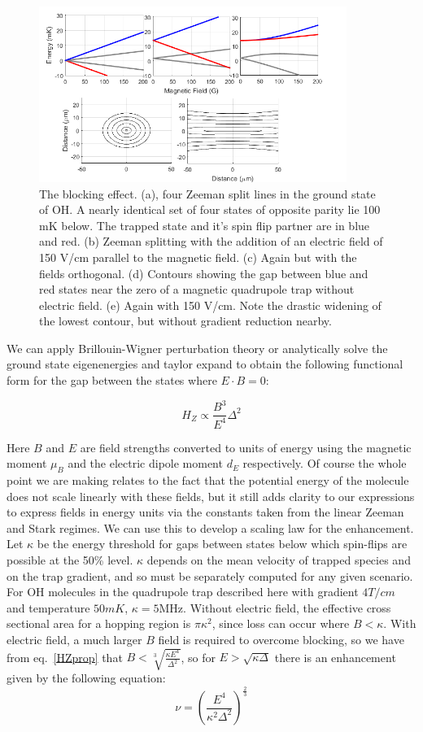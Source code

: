 \documentclass[%
 reprint,
 amsmath,amssymb,
 aps,
prl,
]{revtex4-1}
\begin{document}
\begin{figure}[b]
\includegraphics[width=100mm]{blocking.png}%
\caption{
The blocking effect. (a), four Zeeman split lines in the ground state of OH. A nearly identical set of four states of opposite parity lie 100 mK below. The trapped state and it's spin flip partner are in blue and red. (b) Zeeman splitting with the addition of an electric field of 150 V/cm parallel to the magnetic field. (c) Again but with the fields orthogonal. (d) Contours showing the gap between blue and red states near the zero of a magnetic quadrupole trap without electric field. (e) Again with 150 V/cm. Note the drastic widening of the lowest contour, but without gradient reduction nearby.
\label{fig:blocking}}
\end{figure}

We can apply Brillouin-Wigner perturbation theory or analytically solve the ground state eigenenergies and taylor expand to obtain the following functional form for the gap between the states where $E\cdot B=0$:

\begin{equation}
\label{eq:HZprop}
H_Z\propto \frac{B^3}{E^4}\Delta^2
\end{equation}

\noindent Here $B$ and $E$ are field strengths converted to units of energy using the magnetic moment $\mu_B$ and the electric dipole moment $d_E$ respectively. Of course the whole point we are making relates to the fact that the potential energy of the molecule does not scale linearly with these fields, but it still adds clarity to our expressions to express fields in energy units via the constants taken from the linear Zeeman and Stark regimes. We can use this to develop a scaling law for the enhancement. Let $\kappa$ be the energy threshold for gaps between states below which spin-flips are possible at the 50\% level. $\kappa$ depends on the mean velocity of trapped species and on the trap gradient, and so must be separately computed for any given scenario. For OH molecules in the quadrupole trap described here \cite{} with gradient $4T/cm$ and temperature $50mK$, $\kappa=5\text{MHz}$. Without electric field, the effective cross sectional area for a hopping region is $\pi \kappa^2$, since loss can occur where $B<\kappa$. With electric field, a much larger $B$ field is required to overcome blocking, so we have from eq.~\ref{HZprop} that $B < \sqrt[3]{\frac{\kappa E^4}{\Delta^2}}$, so for $E>\sqrt{\kappa\Delta}$ there is an enhancement given by the following equation:
\begin{equation}
\nu = \left(\frac{E^4}{\kappa^2\Delta^2}\right)^\frac{2}{3}
\label{eq:blimit}
\end{equation} 
\end{document}
